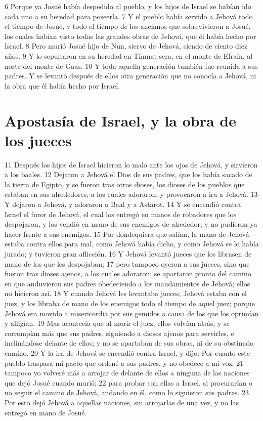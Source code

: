 6 Porque ya Josué había despedido al pueblo, y los hijos de Israel se habían ido cada uno a su heredad para poseerla.
7 Y el pueblo había servido a Jehová todo el tiempo de Josué, y todo el tiempo de los ancianos que sobrevivieron a Josué, los cuales habían visto todas las grandes obras de Jehová, que él había hecho por Israel.
8 Pero murió Josué hijo de Nun, siervo de Jehová, siendo de ciento diez años.
9 Y lo sepultaron en su heredad en Timnat-sera, en el monte de Efraín, al norte del monte de Gaas.
10 Y toda aquella generación también fue reunida a sus padres. Y se levantó después de ellos otra generación que no conocía a Jehová, ni la obra que él había hecho por Israel.
\section*{Apostasía de Israel, y la obra de los jueces}

11 Después los hijos de Israel hicieron lo malo ante los ojos de Jehová, y sirvieron a los baales.
12 Dejaron a Jehová el Dios de sus padres, que los había sacado de la tierra de Egipto, y se fueron tras otros dioses, los dioses de los pueblos que estaban en sus alrededores, a los cuales adoraron; y provocaron a ira a Jehová.
13 Y dejaron a Jehová, y adoraron a Baal y a Astarot.
14 Y se encendió contra Israel el furor de Jehová, el cual los entregó en manos de robadores que los despojaron, y los vendió en mano de sus enemigos de alrededor; y no pudieron ya hacer frente a sus enemigos.
15 Por dondequiera que salían, la mano de Jehová estaba contra ellos para mal, como Jehová había dicho, y como Jehová se lo había jurado; y tuvieron gran aflicción.
16 Y Jehová levantó jueces que los librasen de mano de los que les despojaban;
17 pero tampoco oyeron a sus jueces, sino que fueron tras dioses ajenos, a los cuales adoraron; se apartaron pronto del camino en que anduvieron sus padres obedeciendo a los mandamientos de Jehová; ellos no hicieron así.
18 Y cuando Jehová les levantaba jueces, Jehová estaba con el juez, y los libraba de mano de los enemigos todo el tiempo de aquel juez; porque Jehová era movido a misericordia por sus gemidos a causa de los que los oprimían y afligían. 
19 Mas acontecía que al morir el juez, ellos volvían atrás, y se corrompían más que sus padres, siguiendo a dioses ajenos para servirles, e inclinándose delante de ellos; y no se apartaban de sus obras, ni de su obstinado camino.
20 Y la ira de Jehová se encendió contra Israel, y dijo: Por cuanto este pueblo traspasa mi pacto que ordené a sus padres, y no obedece a mi voz,
21 tampoco yo volveré más a arrojar de delante de ellos a ninguna de las naciones que dejó Josué cuando murió;
22 para probar con ellas a Israel, si procurarían o no seguir el camino de Jehová, andando en él, como lo siguieron sus padres.
23 Por esto dejó Jehová a aquellas naciones, sin arrojarlas de una vez, y no las entregó en mano de Josué.

